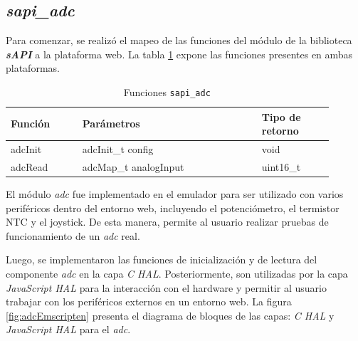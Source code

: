 \subsection{\textit{\textbf{sapi\_adc}}}

Para comenzar, se realizó el mapeo de las funciones del módulo de la biblioteca \textit{\textbf{sAPI}} a la plataforma web. La tabla \ref{tab:sapiADC} expone las funciones presentes en ambas plataformas.


\begin{table}[h]
	\centering
	\caption[Funciones \texttt{sapi\_adc}]{Funciones \texttt{sapi\_adc}}
	\begin{tabular}{p{0.20\linewidth} p{0.50\linewidth}  p{0.20\linewidth}}    
		\toprule
		\textbf{Función} 	 & \textbf{Parámetros} 		& \textbf{Tipo de retorno}  \\
		\midrule
		adcInit & adcInit\_t config		&  void \\		
		adcRead	 & adcMap\_t analogInput	&  uint16\_t \\
		\bottomrule
		\hline
	\end{tabular}
	\label{tab:sapiADC}
\end{table}

El módulo \textit{adc} fue implementado en el emulador  para ser utilizado con varios periféricos dentro del entorno web, incluyendo el potenciómetro, el termistor NTC y el joystick. De esta manera, permite al usuario realizar pruebas de funcionamiento de un \textit{adc} real. 

Luego, se implementaron las funciones de inicialización y de lectura del componente \textit{adc}  en la capa \textit{C HAL}. Posteriormente, son utilizadas por la capa \textit{JavaScript HAL} para la interacción con el hardware y permitir al usuario trabajar con los periféricos externos en un entorno web. La figura \ref{fig:adcEmscripten} presenta el diagrama de bloques de las capas: \textit{C HAL} y \textit{JavaScript HAL} para el \textit{adc}.

